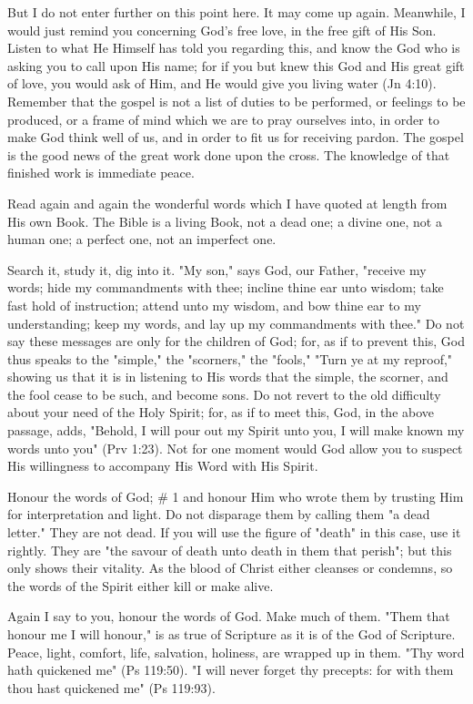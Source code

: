 \documentclass[
]{book}
\begin{document}
But I do not enter further on this point here. It may come up again. Meanwhile, I would just remind you concerning God's free love, in the free gift of His Son. Listen to what He Himself has told you regarding this, and know the God who is asking you to call upon His name; for if you but knew this God and His great gift of love, you would ask of Him, and He would give you living water (Jn 4:10). Remember that the gospel is not a list of duties to be performed, or feelings to be produced, or a frame of mind which we are to pray ourselves into, in order to make God think well of us, and in order to fit us for receiving pardon. The gospel is the good news of the great work done upon the cross. The knowledge of that finished work is immediate peace.

Read again and again the wonderful words which I have quoted at length from His own Book. The Bible is a living Book, not a dead one; a divine one, not a human one; a perfect one, not an imperfect one.

Search it, study it, dig into it. "My son," says God, our Father, "receive my words; hide my commandments with thee; incline thine ear unto wisdom; take fast hold of instruction; attend unto my wisdom, and bow thine ear to my understanding; keep my words, and lay up my commandments with thee." Do not say these messages are only for the children of God; for, as if to prevent this, God thus speaks to the "simple," the "scorners," the "fools," "Turn ye at my reproof," showing us that it is in listening to His words that the simple, the scorner, and the fool cease to be such, and become sons. Do not revert to the old difficulty about your need of the Holy Spirit; for, as if to meet this, God, in the above passage, adds, "Behold, I will pour out my Spirit unto you, I will make known my words unto you" (Prv 1:23). Not for one moment would God allow you to suspect His willingness to accompany His Word with His Spirit.

Honour the words of God;
\# 1
and honour Him who wrote them by trusting Him for interpretation and light. Do not disparage them by calling them "a dead letter." They are not dead. If you will use the figure of "death" in this case, use it rightly. They are "the savour of death unto death in them that perish"; but this only shows their vitality. As the blood of Christ either cleanses or condemns, so the words of the Spirit either kill or make alive.

Again I say to you, honour the words of God. Make much of them. "Them that honour me I will honour," is as true of Scripture as it is of the God of Scripture. Peace, light, comfort, life, salvation, holiness, are wrapped up in them. "Thy word hath quickened me" (Ps 119:50). "I will never forget thy precepts: for with them thou hast quickened me" (Ps 119:93).
\end{document}
